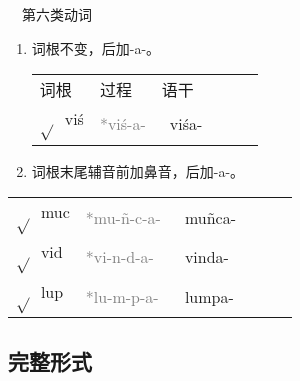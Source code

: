 \documentclass[17pt]{beamer}
\newcommand{\skt}[1]{{\sanskritfont{#1}}} %
\newcommand{\skttrans}[1]{{\skt{#1}~#1}}  %
\newcommand{\verbroot}[1]{{$\sqrt{#1}$}}
\newcommand{\sktroot}[1]{{\verbroot{}\skt{#1}}}
\newcommand{\skttransroot}[1]{{\sktroot{#1}~#1}}
\begin{document}
\begin{frame}{\insertsubsection ~~第六类动词}
  \small
  \begin{enumerate}
    \item
      词根不变，后加\nobreakdash-a\nobreakdash-。

      \begin{tabular}{@{}llllll@{}} %
        词根 & 过程 & 语干  \\
        \skttransroot{viś} & \textcolor{gray}{*viś-a-} & \skttrans{viśa-}  \\
      \end{tabular}
   
    \item
      词根末尾辅音前加鼻音，后加\nobreakdash-a\nobreakdash-。
  \end{enumerate} 

  \centering
  \begin{tabular}{@{}llllll@{}} %
    \skttransroot{muc} & \textcolor{gray}{*mu-ñ-c-a-} & \skttrans{muñca-}  \\
    \skttransroot{vid} & \textcolor{gray}{*vi-n-d-a-} & \skttrans{vinda-}  \\
    \skttransroot{lup} & \textcolor{gray}{*lu-m-p-a-} & \skttrans{lumpa-}  \\
  \end{tabular}

\end{frame}

\subsection{完整形式}
\end{document}
